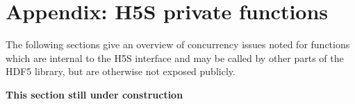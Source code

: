 \documentclass[../HDF5_RFC.tex]{subfiles}
\begin{document}
\newpage

\section{Appendix: H5S private functions}
\label{apdx:h5s_int_functions}

The following sections give an overview of concurrency issues noted for functions
which are internal to the H5S interface and may be called by other parts of the
HDF5 library, but are otherwise not exposed publicly.

\textbf{This section still under construction}
\end{document}
